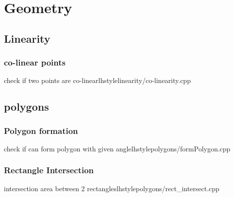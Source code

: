 \section{Geometry}
    \subsection{Linearity}
        \subsubsection{co-linear points}
           {check if two points are co-linear}{lhstyle}{linearity/co-linearity.cpp}
    \subsection{polygons}
        \subsubsection{Polygon formation}
           {check if can form polygon with given angle}{lhstyle}{polygons/formPolygon.cpp}
        \subsubsection{Rectangle Intersection}
           {intersection area between 2 rectangles}{lhstyle}{polygons/rect_intersect.cpp}
